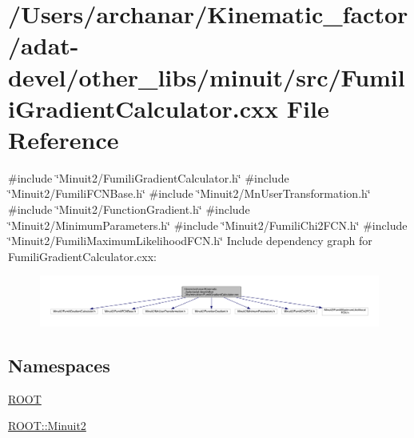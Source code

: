 \hypertarget{adat-devel_2other__libs_2minuit_2src_2FumiliGradientCalculator_8cxx}{}\section{/\+Users/archanar/\+Kinematic\+\_\+factor/adat-\/devel/other\+\_\+libs/minuit/src/\+Fumili\+Gradient\+Calculator.cxx File Reference}
\label{adat-devel_2other__libs_2minuit_2src_2FumiliGradientCalculator_8cxx}
{\ttfamily \#include \char`\"{}Minuit2/\+Fumili\+Gradient\+Calculator.\+h\char`\"{}}\newline
{\ttfamily \#include \char`\"{}Minuit2/\+Fumili\+F\+C\+N\+Base.\+h\char`\"{}}\newline
{\ttfamily \#include \char`\"{}Minuit2/\+Mn\+User\+Transformation.\+h\char`\"{}}\newline
{\ttfamily \#include \char`\"{}Minuit2/\+Function\+Gradient.\+h\char`\"{}}\newline
{\ttfamily \#include \char`\"{}Minuit2/\+Minimum\+Parameters.\+h\char`\"{}}\newline
{\ttfamily \#include \char`\"{}Minuit2/\+Fumili\+Chi2\+F\+C\+N.\+h\char`\"{}}\newline
{\ttfamily \#include \char`\"{}Minuit2/\+Fumili\+Maximum\+Likelihood\+F\+C\+N.\+h\char`\"{}}\newline
Include dependency graph for Fumili\+Gradient\+Calculator.\+cxx\+:
\nopagebreak
\begin{figure}[H]
\begin{center}
\leavevmode
\includegraphics[width=350pt]{da/d61/adat-devel_2other__libs_2minuit_2src_2FumiliGradientCalculator_8cxx__incl}
\end{center}
\end{figure}
\subsection*{Namespaces}
\begin{DoxyCompactItemize}
\item 
 \mbox{\hyperlink{namespaceROOT}{R\+O\+OT}}
\item 
 \mbox{\hyperlink{namespaceROOT_1_1Minuit2}{R\+O\+O\+T\+::\+Minuit2}}
\end{DoxyCompactItemize}
